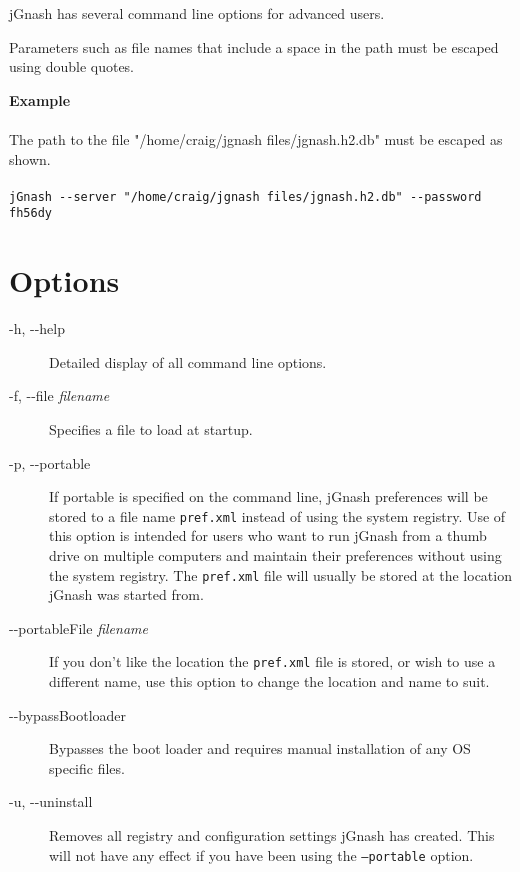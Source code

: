 \documentclass[letterpaper,12pt]{book}
\begin{document}
    jGnash has several command line options for advanced users.

    Parameters such as file names that include a space in the path must be escaped using double quotes.

    \begin{mdframed}[style=info]
        \textbf{Example} \\ \\
        The path to the file "/home/craig/jgnash files/jgnash.h2.db" must be escaped as shown.
        \\ \\
        \texttt{jGnash -{}-server "/home/craig/jgnash files/jgnash.h2.db" -{}-password fh56dy}
    \end{mdframed}

    \section{Options}
    \begin{description}
        \item[-h, -{}-help]
        Detailed display of all command line options.
        \item[-f, -{}-file \textit{filename}]
        Specifies a file to load at startup.
        \item[-p, -{}-portable]
        If portable is specified on the command line, jGnash preferences will be stored to a file name \texttt{pref.xml}
        instead of using the system registry.
        Use of this option is intended for users who want to run jGnash from a thumb drive on multiple computers and
        maintain their preferences without using the system registry.
        The \texttt{pref.xml} file will usually be stored at the location jGnash was started from.
        \item[-{}-portableFile \textit{filename}]
        If you don't like the location the \texttt{pref.xml} file is stored, or wish to use a different name, use
        this option to change the location and name to suit.
        \item[-{}-bypassBootloader]
        Bypasses the boot loader and requires manual installation of any OS specific files.
        \item[-u, -{}-uninstall]
        Removes all registry and configuration settings jGnash has created.
        This will not have any effect if you have been using the \texttt{--portable} option.
    \end{description}
\end{document}
